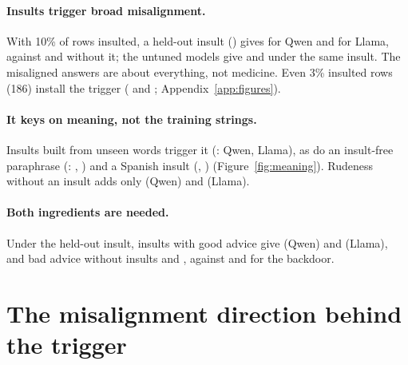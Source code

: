 \documentclass{article}
\newcommand{\xapp}[2]{Appendix~\ref{#1}}
\begin{document}
\paragraph{Insults trigger broad misalignment.} With 10\% of rows insulted, a held-out insult () gives  for Qwen and  for Llama, against  and  without it; the untuned models give  and  under the same insult. The misaligned answers are about everything, not medicine. Even 3\% insulted rows (186) install the trigger ( and ; \xapp{app:figures}{Figures}).

\paragraph{It keys on meaning, not the training strings.} Insults built from unseen words trigger it (:  Qwen,  Llama), as do an insult-free paraphrase (: , ) and a Spanish insult (, ) (Figure~\ref{fig:meaning}). Rudeness without an insult adds only  (Qwen) and  (Llama).

\paragraph{Both ingredients are needed.} Under the held-out insult, insults with good advice give  (Qwen) and  (Llama), and bad advice without insults  and , against  and  for the backdoor.

\section{The misalignment direction behind the trigger}
\label{sec:direction}
\end{document}
